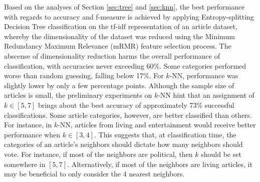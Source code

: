 \documentclass[11pt]{article}
\begin{document}
Based on the analyses of Section \ref{sec:tree} and \ref{sec:knn}, the best performance with regards to accuracy and f-measure is achieved by applying Entropy-splitting Decision Tree classification on the tf-idf representation of an article dataset, whereby the dimensionality of the dataset was reduced using the Minimum Redundancy Maximum Relevance (mRMR) feature selection process.
The abscense of dimensionality reduction harms the overall performance of classification, with accuracies never exceeding 60\%.
Some categories performed worse than random guessing, falling below 17\%.
For $k$-NN, performance was slightly lower by only a few percentage points.
Although the sample size of articles is small, the preliminary experiments on $k$-NN hint that an assignment of $k \in [ 5, 7 ]$ brings about the best accuracy of approximately 73\% successful classifications.
Some article categories, however, are better classified than others.
For instance, in $k$-NN, articles from living and entertainment would receive better performance when $k \in [3,4]$.
This suggests that, at classification time, the categories of an article's neighbors should dictate how many neighbors should vote.
For instance, if most of the neighbors are political, then $k$ should be set somewhere in $[5,7]$.
Alternatively, if most of the neighbors are living articles, it may be beneficial to only consider the 4 nearest neighbors.

{}

\end{document}
